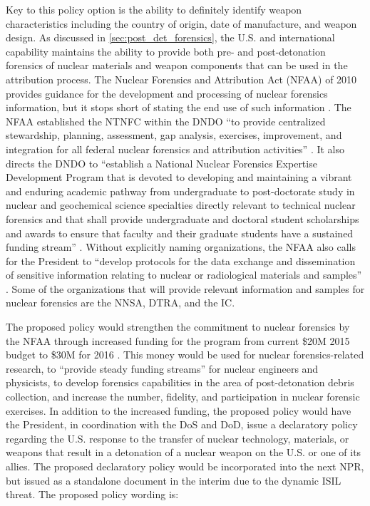 \documentclass{report}
\begin{document}
Key to this policy option is the ability to definitely identify weapon characteristics including the country of origin, date of manufacture, and weapon design.  As discussed in \autoref{sec:post_det_forensics}, the U.S. and international capability maintains the ability to provide both pre- and post-detonation forensics of nuclear materials and weapon components that can be used in the attribution process.  The Nuclear Forensics and Attribution Act (NFAA) of 2010 provides guidance for the development and processing of nuclear forensics information, but it stops short of stating the end use of such information \cite{Act2010}.  The NFAA established the NTNFC within the DNDO \enquote{to provide centralized stewardship, planning, assessment, gap analysis, exercises, improvement, and integration for all federal nuclear forensics and attribution activities} \cite{Act2010}.  It also directs the DNDO to \enquote{establish a National Nuclear Forensics Expertise Development Program that is devoted to developing and maintaining a vibrant and enduring academic pathway from undergraduate to post-doctorate study in nuclear and geochemical science specialties directly relevant to technical nuclear forensics and that shall provide undergraduate and doctoral student scholarships and awards to ensure that faculty and their graduate students have a sustained funding stream} \cite{Act2010}.  Without explicitly naming organizations, the NFAA also calls for the President to \enquote{develop protocols for the data exchange and dissemination of sensitive information relating to nuclear or radiological materials and samples} \cite{Act2010}.  Some of the organizations that will provide relevant information and samples for nuclear forensics are the NNSA, DTRA, and the IC.    

The proposed policy  would strengthen the commitment to nuclear forensics by the NFAA through increased funding for the program from current \$20M 2015 budget to \$30M for 2016 \cite{Year2015}.  This money would be used for nuclear forensics-related research, to \enquote{provide steady funding streams} for nuclear engineers and physicists, to develop forensics capabilities in the area of post-detonation debris collection, and increase the number, fidelity, and participation in nuclear forensic exercises.  In addition to the increased funding, the proposed policy  would have the President, in coordination with the DoS and DoD, issue a declaratory policy regarding the U.S. response to the transfer of nuclear technology, materials, or weapons that result in a detonation of a nuclear weapon on the U.S. or one of its allies.  The proposed declaratory policy would be incorporated into the next NPR, but issued as a standalone document in the interim due to the dynamic ISIL threat.  The proposed policy wording is:
\end{document}
